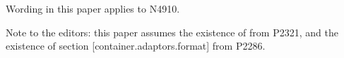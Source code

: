 
% 

Wording in this paper applies to N4910.

Note to the editors: this paper assumes the existence
of  from P2321, and the existence of section
[container.adaptors.format] from P2286.

\markboth{\contentsname}{}

\makeatletter
\renewcommand\@pnumwidth{2.5em}
\makeatother

\tableofcontents
\setcounter{tocdepth}{5}

%
